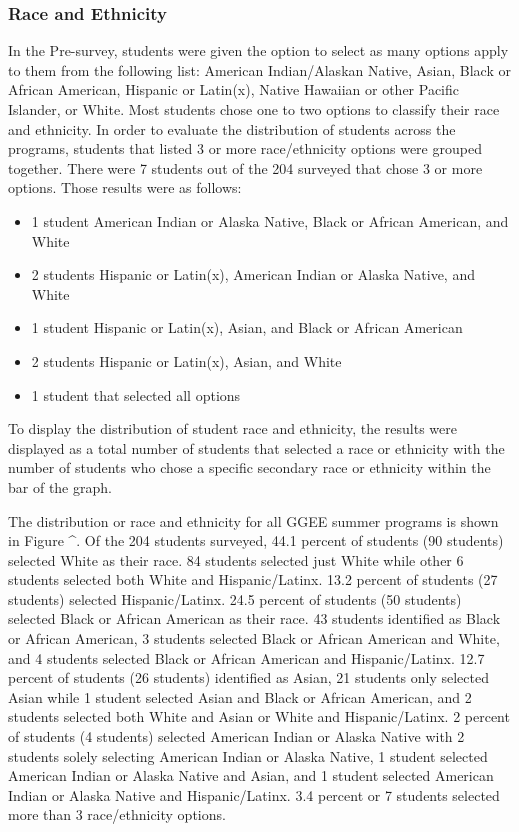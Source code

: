 \documentclass[
]{article}
\providecommand{\tightlist}{%
  \setlength{\itemsep}{0pt}\setlength{\parskip}{0pt}}
\begin{document}
\hypertarget{race-and-ethnicity}{%
\subsubsection{Race and Ethnicity}\label{race-and-ethnicity}}

In the Pre-survey, students were given the option to select as many
options apply to them from the following list: American Indian/Alaskan
Native, Asian, Black or African American, Hispanic or Latin(x), Native
Hawaiian or other Pacific Islander, or White. Most students chose one to
two options to classify their race and ethnicity. In order to evaluate
the distribution of students across the programs, students that listed 3
or more race/ethnicity options were grouped together. There were 7
students out of the 204 surveyed that chose 3 or more options. Those
results were as follows:

\begin{itemize}
\tightlist
\item
  1 student American Indian or Alaska Native, Black or African American,
  and White
\item
  2 students Hispanic or Latin(x), American Indian or Alaska Native, and
  White
\item
  1 student Hispanic or Latin(x), Asian, and Black or African American
\item
  2 students Hispanic or Latin(x), Asian, and White
\item
  1 student that selected all options
\end{itemize}

To display the distribution of student race and ethnicity, the results
were displayed as a total number of students that selected a race or
ethnicity with the number of students who chose a specific secondary
race or ethnicity within the bar of the graph.

The distribution or race and ethnicity for all GGEE summer programs is
shown in Figure \^{}. Of the 204 students surveyed, 44.1 percent of
students (90 students) selected White as their race. 84 students
selected just White while other 6 students selected both White and
Hispanic/Latinx. 13.2 percent of students (27 students) selected
Hispanic/Latinx. 24.5 percent of students (50 students) selected Black
or African American as their race. 43 students identified as Black or
African American, 3 students selected Black or African American and
White, and 4 students selected Black or African American and
Hispanic/Latinx. 12.7 percent of students (26 students) identified as
Asian, 21 students only selected Asian while 1 student selected Asian
and Black or African American, and 2 students selected both White and
Asian or White and Hispanic/Latinx. 2 percent of students (4 students)
selected American Indian or Alaska Native with 2 students solely
selecting American Indian or Alaska Native, 1 student selected American
Indian or Alaska Native and Asian, and 1 student selected American
Indian or Alaska Native and Hispanic/Latinx. 3.4 percent or 7 students
selected more than 3 race/ethnicity options.
\end{document}
